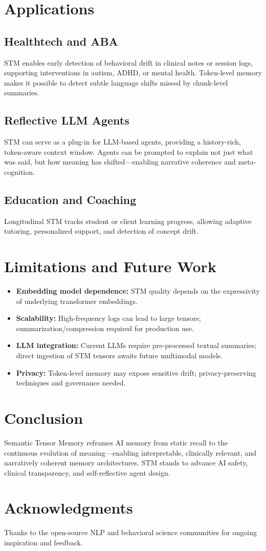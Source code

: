 \documentclass[11pt]{article}
\begin{document}
\section{Applications}
\subsection{Healthtech and ABA}
STM enables early detection of behavioral drift in clinical notes or session logs, supporting interventions in autism, ADHD, or mental health. Token-level memory makes it possible to detect subtle language shifts missed by chunk-level summaries.

\subsection{Reflective LLM Agents}
STM can serve as a plug-in for LLM-based agents, providing a history-rich, token-aware context window. Agents can be prompted to explain not just what was said, but how meaning has shifted---enabling narrative coherence and meta-cognition.

\subsection{Education and Coaching}
Longitudinal STM tracks student or client learning progress, allowing adaptive tutoring, personalized support, and detection of concept drift.

\section{Limitations and Future Work}
\begin{itemize}[leftmargin=2em]
    \item \textbf{Embedding model dependence:} STM quality depends on the expressivity of underlying transformer embeddings.
    \item \textbf{Scalability:} High-frequency logs can lead to large tensors; summarization/compression required for production use.
    \item \textbf{LLM integration:} Current LLMs require pre-processed textual summaries; direct ingestion of STM tensors awaits future multimodal models.
    \item \textbf{Privacy:} Token-level memory may expose sensitive drift; privacy-preserving techniques and governance needed.
\end{itemize}

\section{Conclusion}
Semantic Tensor Memory reframes AI memory from static recall to the continuous evolution of meaning---enabling interpretable, clinically relevant, and narratively coherent memory architectures. STM stands to advance AI safety, clinical transparency, and self-reflective agent design.

\section*{Acknowledgments}
Thanks to the open-source NLP and behavioral science communities for ongoing inspiration and feedback.



\end{document}
